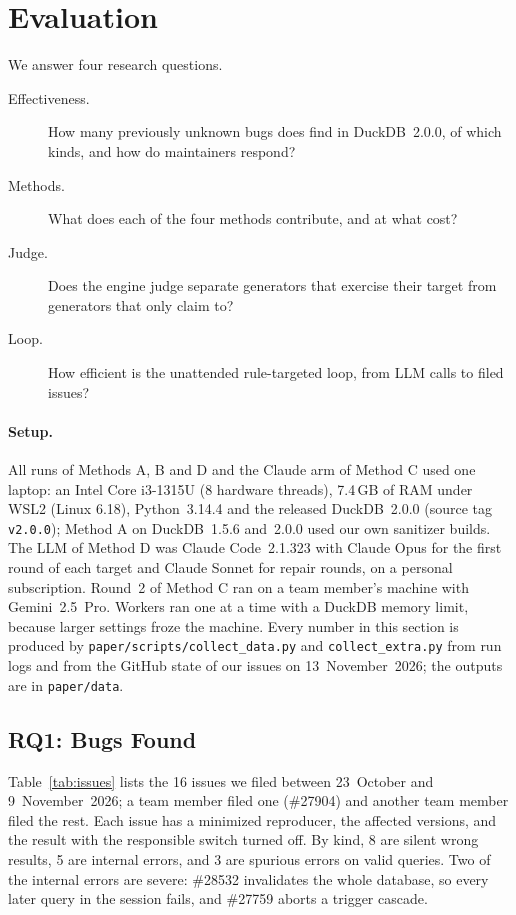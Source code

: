 \section{Evaluation}
\label{sec:evaluation}

We answer four research questions.
\begin{description}
  \item[ Effectiveness.] How many previously unknown bugs does \tool find in DuckDB~2.0.0, of which kinds, and
        how do maintainers respond?
  \item[ Methods.] What does each of the four methods contribute, and at what cost?
  \item[ Judge.] Does the engine judge separate generators that exercise their target from generators that
        only claim to?
  \item[ Loop.] How efficient is the unattended rule-targeted loop, from LLM calls to filed issues?
\end{description}

\paragraph{Setup.} All runs of Methods A, B and D and the Claude arm of Method C used one laptop: an Intel Core
i3-1315U (8 hardware threads), 7.4\,GB of RAM under WSL2 (Linux 6.18), Python~3.14.4 and the released DuckDB~2.0.0
(source tag \texttt{v2.0.0}); Method A on DuckDB~1.5.6 and~2.0.0 used our own sanitizer builds. The LLM of Method D was
Claude Code~2.1.323 with Claude Opus for the first round of each target and Claude Sonnet for repair rounds, on a
personal subscription. Round~2 of Method C ran on a team member's machine with Gemini~2.5~Pro. Workers ran one at a
time with a DuckDB memory limit, because larger settings froze the machine. Every number in this section is produced
by \texttt{paper/scripts/collect\_data.py} and \texttt{collect\_extra.py} from run logs and from the GitHub state of our
issues on 13~November~2026; the outputs are in \texttt{paper/data}.

\subsection{RQ1: Bugs Found}
\label{sec:eval-bugs}



Table~\ref{tab:issues} lists the 16 issues we filed between 23~October and 9~November~2026; a team member filed one
(\#27904) and another team member filed the rest. Each issue has a minimized reproducer, the affected versions, and the
result with the responsible switch turned off. By kind, 8 are silent wrong results, 5 are internal errors, and 3 are
spurious errors on valid queries. Two of the internal errors are severe: \#28532 invalidates the whole database, so
every later query in the session fails, and \#27759 aborts a trigger cascade.

